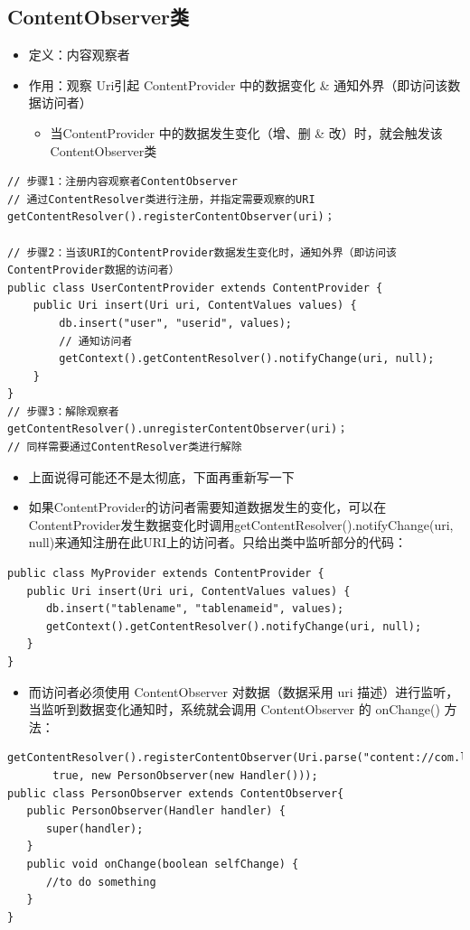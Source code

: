 \documentclass[9pt, b5paper]{article}
\begin{document}
\subsection{ContentObserver类}
\label{sec-1-7}
\begin{itemize}
\item 定义：内容观察者
\item 作用：观察 Uri引起 ContentProvider 中的数据变化 \& 通知外界（即访问该数据访问者）
\begin{itemize}
\item 当ContentProvider 中的数据发生变化（增、删 \& 改）时，就会触发该 ContentObserver类
\end{itemize}
\end{itemize}
\begin{verbatim}
// 步骤1：注册内容观察者ContentObserver
// 通过ContentResolver类进行注册，并指定需要观察的URI
getContentResolver().registerContentObserver(uri)；

// 步骤2：当该URI的ContentProvider数据发生变化时，通知外界（即访问该ContentProvider数据的访问者）
public class UserContentProvider extends ContentProvider { 
    public Uri insert(Uri uri, ContentValues values) { 
        db.insert("user", "userid", values); 
        // 通知访问者
        getContext().getContentResolver().notifyChange(uri, null); 
    } 
}
// 步骤3：解除观察者
getContentResolver().unregisterContentObserver(uri)；
// 同样需要通过ContentResolver类进行解除
\end{verbatim}
\begin{itemize}
\item 上面说得可能还不是太彻底，下面再重新写一下
\item 如果ContentProvider的访问者需要知道数据发生的变化，可以在ContentProvider发生数据变化时调用getContentResolver().notifyChange(uri, null)来通知注册在此URI上的访问者。只给出类中监听部分的代码：
\end{itemize}
\begin{verbatim}
public class MyProvider extends ContentProvider {
   public Uri insert(Uri uri, ContentValues values) {
      db.insert("tablename", "tablenameid", values);
      getContext().getContentResolver().notifyChange(uri, null);
   }
}
\end{verbatim}
\begin{itemize}
\item 而访问者必须使用 ContentObserver 对数据（数据采用 uri 描述）进行监听，当监听到数据变化通知时，系统就会调用 ContentObserver 的 onChange() 方法：
\end{itemize}
\begin{verbatim}
getContentResolver().registerContentObserver(Uri.parse("content://com.ljq.providers.personprovider/person"),
       true, new PersonObserver(new Handler()));
public class PersonObserver extends ContentObserver{
   public PersonObserver(Handler handler) {
      super(handler);
   }
   public void onChange(boolean selfChange) {
      //to do something
   }
}
\end{verbatim}
\end{document}
